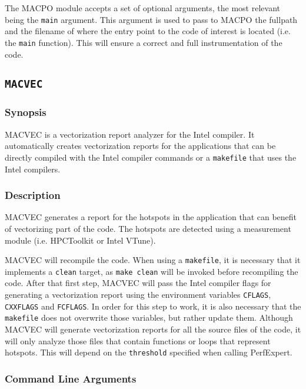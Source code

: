 The MACPO module accepts a set of optional arguments, the most relevant being the \texttt{main} argument. This
argument is used to pass to MACPO the fullpath and the filename of where the entry point to the code of interest
is located (i.e. the \texttt{main} function). This will ensure a correct and full instrumentation of the code.

\subsection{\texttt{MACVEC}}


\subsubsection{Synopsis}

MACVEC is a vectorization report analyzer for the Intel compiler. It automatically creates vectorization reports
for the applications that can be directly compiled with the Intel compiler commands or a \texttt{makefile} that uses
the Intel compilers.

\subsubsection{Description}

MACVEC generates a report for the hotspots in the application that can benefit of vectorizing part of the code. The
hotspots are detected using a measurement module (i.e. HPCToolkit or Intel VTune).

MACVEC will recompile the code. When using a \texttt{makefile}, it is necessary that it implements a \texttt{clean}
target, as \texttt{make clean} will be invoked before recompiling the code. After that first step, MACVEC will 
pass the Intel compiler flags for generating a vectorization report using the environment variables \texttt{CFLAGS},
\texttt{CXXFLAGS} and \texttt{FCFLAGS}. In order for this step to work, it is also necessary that the \texttt{makefile}
does not overwrite those variables, but rather update them. Although MACVEC will generate vectorization reports for
all the source files of the code, it will only analyze those files that contain functions or loops that represent
hotspots. This will depend on the \texttt{threshold} specified when calling PerfExpert.


\subsubsection{Command Line Arguments}

